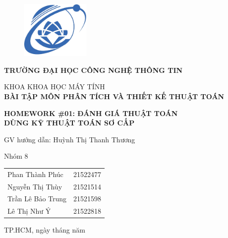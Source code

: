 
\begin{center}
    \begin{figure}
        \centering
        \includegraphics[width=0.3\textwidth]{resources/uitlogo.png}
    \end{figure}
    
    \Large
    \textbf{TRƯỜNG ĐẠI HỌC CÔNG NGHỆ THÔNG TIN\\}

    \vspace{0,5cm}
    KHOA KHOA HỌC MÁY TÍNH\\
    
    \vspace{3cm}
    \textbf{BÀI TẬP MÔN PHÂN TÍCH VÀ THIẾT KẾ THUẬT TOÁN\\}
    
    \vspace{0.5cm}
    \textbf{HOMEWORK \#01: ĐÁNH GIÁ THUẬT TOÁN\\ DÙNG KỸ THUẬT TOÁN SƠ CẤP\\}

    \large
    \vspace{4cm}
    GV hướng dẫn: Huỳnh Thị Thanh Thương\\
    \vspace{1cm}

    \normalsize
    Nhóm 8\\
    \vspace{0.5cm}
    \begin{tabular}{ l r }
        Phan Thành Phúc & 21522477\\
        Nguyễn Thị Thùy & 21521514\\
        Trần Lê Bảo Trung & 21521598\\
        Lê Thị Như Ý & 21522818\\
    \end{tabular}
\end{center}

\vfill
\begin{flushright}
    TP.HCM, ngày tháng năm\\     
\end{flushright}

